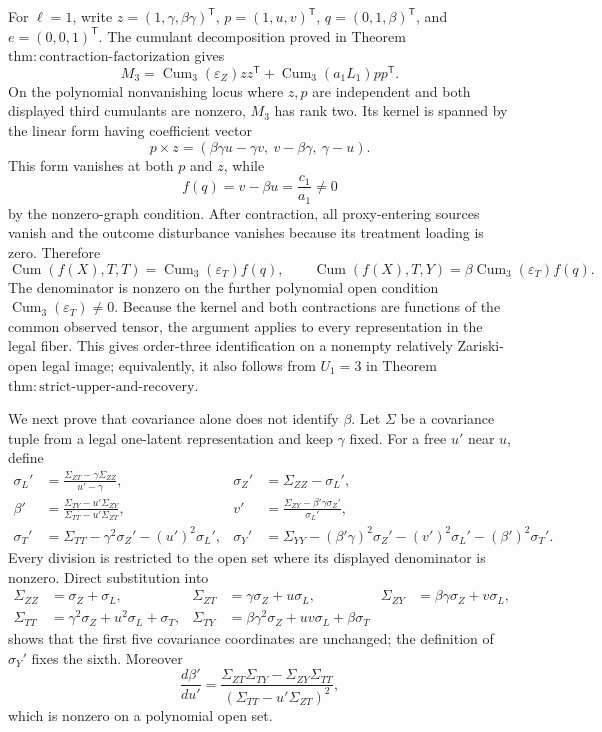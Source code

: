 For \(\ell=1\), write \(z=(1,\gamma,\beta\gamma)^{\mathsf T}\), \(p=(1,u,v)^{\mathsf T}\), \(q=(0,1,\beta)^{\mathsf T}\), and \(e=(0,0,1)^{\mathsf T}\).  The cumulant decomposition proved in Theorem \(\mathrm{thm:contraction\mbox{-}factorization}\) gives
\[
 M_3=\operatorname{Cum}_3(\varepsilon_Z)zz^{\mathsf T}
     +\operatorname{Cum}_3(a_1L_1)pp^{\mathsf T}.
\]
On the polynomial nonvanishing locus where \(z,p\) are independent and both displayed third cumulants are nonzero, \(M_3\) has rank two.  Its kernel is spanned by the linear form having coefficient vector
\[
 p\times z=(\beta\gamma u-\gamma v,\ v-\beta\gamma,\ \gamma-u).
\]
This form vanishes at both \(p\) and \(z\), while
\[
 f(q)=v-\beta u=\frac{c_1}{a_1}\ne0
\]
by the nonzero-graph condition.  After contraction, all proxy-entering sources vanish and the outcome disturbance vanishes because its treatment loading is zero.  Therefore
\[
 \operatorname{Cum}(f(X),T,T)=\operatorname{Cum}_3(\varepsilon_T)f(q),
 \qquad
 \operatorname{Cum}(f(X),T,Y)=\beta\operatorname{Cum}_3(\varepsilon_T)f(q).
\]
The denominator is nonzero on the further polynomial open condition \(\operatorname{Cum}_3(\varepsilon_T)\ne0\).  Because the kernel and both contractions are functions of the common observed tensor, the argument applies to every representation in the legal fiber.  This gives order-three identification on a nonempty relatively Zariski-open legal image; equivalently, it also follows from \(U_1=3\) in Theorem \(\mathrm{thm:strict\mbox{-}upper\mbox{-}and\mbox{-}recovery}\).

We next prove that covariance alone does not identify \(\beta\).  Let \(\Sigma\) be a covariance tuple from a legal one-latent representation and keep \(\gamma\) fixed.  For a free \(u'\) near \(u\), define
\[
\begin{aligned}
 \sigma_L'&=\frac{\Sigma_{ZT}-\gamma\Sigma_{ZZ}}{u'-\gamma},
 &\sigma_Z'&=\Sigma_{ZZ}-\sigma_L',\\
 \beta'&=\frac{\Sigma_{TY}-u'\Sigma_{ZY}}
                   {\Sigma_{TT}-u'\Sigma_{ZT}},
 &v'&=\frac{\Sigma_{ZY}-\beta'\gamma\sigma_Z'}{\sigma_L'},\\
 \sigma_T'&=\Sigma_{TT}-\gamma^2\sigma_Z'-(u')^2\sigma_L',
 &\sigma_Y'&=\Sigma_{YY}-(\beta'\gamma)^2\sigma_Z'-(v')^2\sigma_L'-(\beta')^2\sigma_T'.
\end{aligned}
\]
Every division is restricted to the open set where its displayed denominator is nonzero.  Direct substitution into
\[
\begin{aligned}
 \Sigma_{ZZ}&=\sigma_Z+\sigma_L,&
 \Sigma_{ZT}&=\gamma\sigma_Z+u\sigma_L,&
 \Sigma_{ZY}&=\beta\gamma\sigma_Z+v\sigma_L,\\
 \Sigma_{TT}&=\gamma^2\sigma_Z+u^2\sigma_L+\sigma_T,&
 \Sigma_{TY}&=\beta\gamma^2\sigma_Z+uv\sigma_L+\beta\sigma_T
\end{aligned}
\]
shows that the first five covariance coordinates are unchanged; the definition of \(\sigma_Y'\) fixes the sixth.  Moreover
\[
 \frac{d\beta'}{du'}
 =\frac{\Sigma_{ZT}\Sigma_{TY}-\Sigma_{ZY}\Sigma_{TT}}
        {(\Sigma_{TT}-u'\Sigma_{ZT})^2},
\]
which is nonzero on a polynomial open set.

